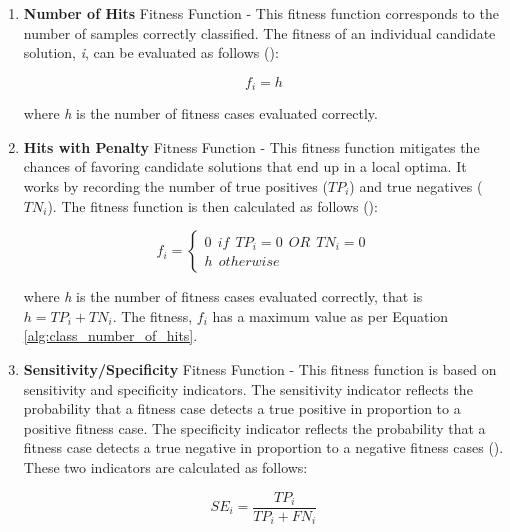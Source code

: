 \begin{enumerate}
    \item \textbf{Number of Hits} Fitness Function - This fitness function corresponds to the number of samples correctly classified. The fitness of an individual candidate solution, \textit{i}, can be evaluated as follows (\cite{ferreira2006gene}):
    \begin{ceqn}
        \begin{equation}\label{alg:class_number_of_hits}
            f_i = h
        \end{equation}
    \end{ceqn}

    \noindent where \textit{h} is the number of fitness cases evaluated correctly.

    \item \textbf{Hits with Penalty} Fitness Function - This fitness function mitigates the chances of favoring candidate solutions that end up in a local optima. It works by recording the number of true positives (\textit{$TP_i$}) and true negatives (\textit{$TN_i$}). The fitness function is then calculated as follows (\cite{ferreira2006gene}):
    \begin{ceqn}
        \begin{equation}\label{alg:class_hits_with_penalty}
            f_{i} =
            \begin{cases} 
                0 \:\: if \:\: TP_i=0\:\:OR\:\:TN_i=0 \\
                h \:\: otherwise
            \end{cases}
        \end{equation}
    \end{ceqn}

    \noindent where \textit{h} is the number of fitness cases evaluated correctly, that is $h = TP_i + TN_i$. The fitness, \textit{$f_i$} has a maximum value as per Equation \ref{alg:class_number_of_hits}.

    \item \textbf{Sensitivity/Specificity} Fitness Function - This fitness function is based on sensitivity and specificity indicators. The sensitivity indicator reflects the probability that a fitness case detects a true positive in proportion to a positive fitness case. The specificity indicator reflects the probability that a fitness case detects a true negative in proportion to a negative fitness cases (\cite{ferreira2006gene}). These two indicators are calculated as follows:
    \begin{ceqn}
        \begin{equation}\label{alg:sensitivity}
            SE_i = \frac{TP_i}{TP_i + FN_i}
        \end{equation}
    \end{ceqn}


\end{enumerate}
